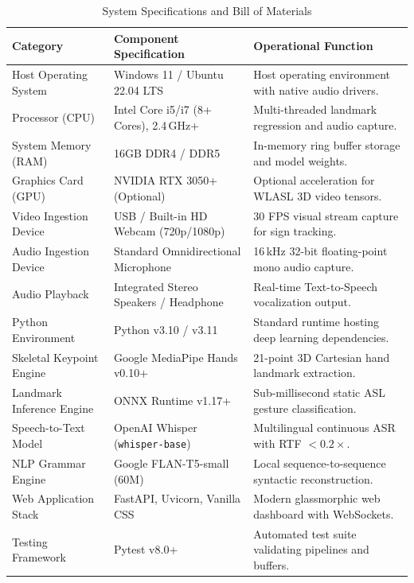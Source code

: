 \documentclass[12pt,a4paper]{report}
\begin{document}
\begin{table}[htbp]
\centering
\caption{System Specifications and Bill of Materials}
\label{tab:app_bom}
\small
\begin{tabularx}{\textwidth}{P{3.2cm}P{4.2cm}L}
\toprule
\textbf{Category} & \textbf{Component Specification} & \textbf{Operational Function} \\
\midrule
Host Operating System & Windows 11 / Ubuntu 22.04 LTS & Host operating environment with native audio drivers. \\
Processor (CPU) & Intel Core i5/i7 (8+ Cores), 2.4\,GHz+ & Multi-threaded landmark regression and audio capture. \\
System Memory (RAM) & 16GB DDR4 / DDR5 & In-memory ring buffer storage and model weights. \\
Graphics Card (GPU) & NVIDIA RTX 3050+ (Optional) & Optional acceleration for WLASL 3D video tensors. \\
Video Ingestion Device & USB / Built-in HD Webcam (720p/1080p) & 30 FPS visual stream capture for sign tracking. \\
Audio Ingestion Device & Standard Omnidirectional Microphone & 16\,kHz 32-bit floating-point mono audio capture. \\
Audio Playback & Integrated Stereo Speakers / Headphone & Real-time Text-to-Speech vocalization output. \\
Python Environment & Python v3.10 / v3.11 & Standard runtime hosting deep learning dependencies. \\
Skeletal Keypoint Engine & Google MediaPipe Hands v0.10+ & 21-point 3D Cartesian hand landmark extraction. \\
Landmark Inference Engine & ONNX Runtime v1.17+ & Sub-millisecond static ASL gesture classification. \\
Speech-to-Text Model & OpenAI Whisper (\texttt{whisper-base}) & Multilingual continuous ASR with RTF $< 0.2\times$. \\
NLP Grammar Engine & Google FLAN-T5-small (60M) & Local sequence-to-sequence syntactic reconstruction. \\
Web Application Stack & FastAPI, Uvicorn, Vanilla CSS & Modern glassmorphic web dashboard with WebSockets. \\
Testing Framework & Pytest v8.0+ & Automated test suite validating pipelines and buffers. \\
\bottomrule
\end{tabularx}
\end{table}
\clearpage
\end{document}
